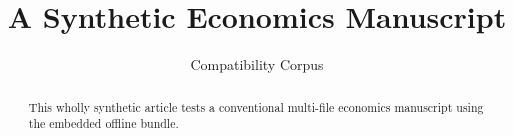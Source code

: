 \documentclass[11pt]{article}
\title{A Synthetic Economics Manuscript}
\author{Compatibility Corpus}
\date{}
\begin{document}
\maketitle
\begin{abstract}
This wholly synthetic article tests a conventional multi-file economics
manuscript using the embedded offline bundle.
\end{abstract}







\end{document}
